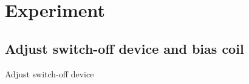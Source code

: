 \section{Experiment}

\subsection{Adjust switch-off device and bias coil}

\begin{frame}{Adjust switch-off device}
\blindtext
\end{frame}
